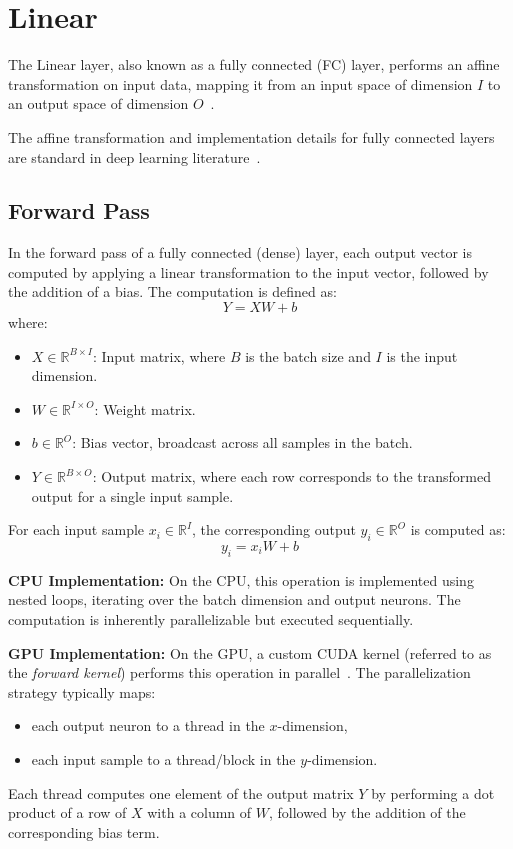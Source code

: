 \section{Linear}

The Linear layer, also known as a fully connected (FC) layer, performs an affine transformation on input data, mapping it from an input space of dimension $I$ to an output space of dimension $O$~\cite{goodfellow2016deep}.

The affine transformation and implementation details for fully connected layers are standard in deep learning literature~\cite{goodfellow2016deep, bishop2006pattern}.

\subsection{Forward Pass}

In the forward pass of a fully connected (dense) layer, each output vector is computed by applying a linear transformation to the input vector, followed by the addition of a bias. The computation is defined as:
\[
    Y = XW + b
\]
where:
\begin{itemize}
    \item \( X \in \mathbb{R}^{B \times I} \): Input matrix, where \( B \) is the batch size and \( I \) is the input dimension.
    \item \( W \in \mathbb{R}^{I \times O} \): Weight matrix.
    \item \( b \in \mathbb{R}^{O} \): Bias vector, broadcast across all samples in the batch.
    \item \( Y \in \mathbb{R}^{B \times O} \): Output matrix, where each row corresponds to the transformed output for a single input sample.
\end{itemize}

For each input sample \( x_i \in \mathbb{R}^I \), the corresponding output \( y_i \in \mathbb{R}^O \) is computed as:
\[
    y_i = x_i W + b
\]

\textbf{CPU Implementation:}  
On the CPU, this operation is implemented using nested loops, iterating over the batch dimension and output neurons. The computation is inherently parallelizable but executed sequentially.

\textbf{GPU Implementation:}  
On the GPU, a custom CUDA kernel (referred to as the \textit{forward kernel}) performs this operation in parallel~\cite{nvidia_cudnn, gcore_gpu_dl}. The parallelization strategy typically maps:
\begin{itemize}
    \item each output neuron to a thread in the \( x \)-dimension,
    \item each input sample to a thread/block in the \( y \)-dimension.
\end{itemize}
Each thread computes one element of the output matrix \( Y \) by performing a dot product of a row of \( X \) with a column of \( W \), followed by the addition of the corresponding bias term.

